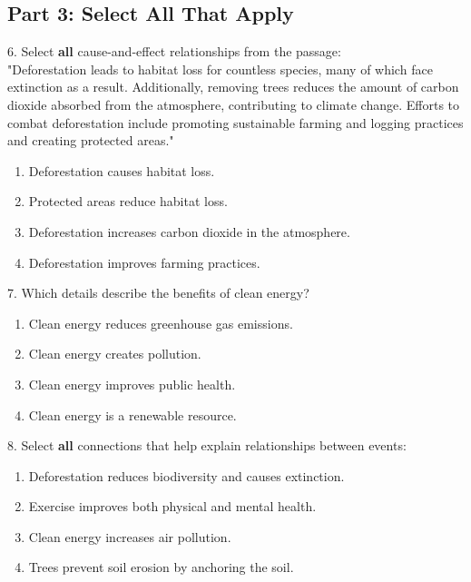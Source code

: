 \documentclass[12pt]{article}
\begin{document}
\subsection*{Part 3: Select All That Apply}

6. Select \textbf{all} cause-and-effect relationships from the passage: \\
"Deforestation leads to habitat loss for countless species, many of which face extinction as a result. Additionally, removing trees reduces the amount of carbon dioxide absorbed from the atmosphere, contributing to climate change. Efforts to combat deforestation include promoting sustainable farming and logging practices and creating protected areas."\\
\begin{enumerate}[label=\Alph*.]
    \item Deforestation causes habitat loss.  
    \item Protected areas reduce habitat loss.  
    \item Deforestation increases carbon dioxide in the atmosphere.  
    \item Deforestation improves farming practices.  
\end{enumerate}

\vspace{1cm}

7. Which details describe the benefits of clean energy?\\
\begin{enumerate}[label=\Alph*.]
    \item Clean energy reduces greenhouse gas emissions.  
    \item Clean energy creates pollution.  
    \item Clean energy improves public health.  
    \item Clean energy is a renewable resource.  
\end{enumerate}

\vspace{1cm}


8. Select \textbf{all} connections that help explain relationships between events:\\
\begin{enumerate}[label=\Alph*.]
    \item Deforestation reduces biodiversity and causes extinction.  
    \item Exercise improves both physical and mental health.  
    \item Clean energy increases air pollution.  
    \item Trees prevent soil erosion by anchoring the soil.  
\end{enumerate}
\end{document}

